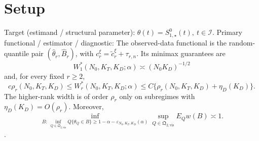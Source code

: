 \documentclass{article}
\begin{document}
\section{Setup}

Target (estimand / structural parameter): \(\theta(t)=S^0_{1,\star}(t),\ t\in\mathcal I\).
Primary functional / estimator / diagnostic: The observed-data functional is the random-quantile pair \((\widehat\theta_r,\widehat B_r)\), with \(c_r^\xi=\widetilde c_r^\xi+\tau_{r,n}\). Its minimax guarantees are
\[
 W_1^*(N_0,K_T,K_D;\alpha)\asymp(N_0K_D)^{-1/2}
\]
and, for every fixed \(r\ge2\),
\[
 c\rho_r(N_0,K_T,K_D)\le W_r^*(N_0,K_T,K_D;\alpha)
 \le C\{\rho_r(N_0,K_T,K_D)+\eta_D(K_D)\}.
\]
The higher-rank width is of order \(\rho_r\) only on subregimes with \(\eta_D(K_D)=O(\rho_r)\). Moreover,
\[
 \inf_{B:\ \inf_{Q\in\mathfrak Q_{2,\mathrm{vis}}}Q\{\theta_Q\in B\}\ge1-\alpha-\varepsilon_{N_0,K_T,K_D}(\alpha)}
 \sup_{Q\in\mathfrak Q_{2,\mathrm{vis}}}E_Qw(B)\asymp1.
\].
\end{document}
